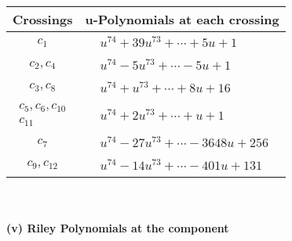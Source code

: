 \documentclass[1p]{elsarticle_modified}
\theoremstyle{definition}
\begin{document}
\begin{tabular}{m{50pt}|m{274pt}}
Crossings & \hspace{64pt}u-Polynomials at each crossing \\
\hline $$\begin{aligned}c_{1}\end{aligned}$$&$\begin{aligned}
&u^{74}+39 u^{73}+\cdots+5 u+1
\end{aligned}$\\
\hline $$\begin{aligned}c_{2},c_{4}\end{aligned}$$&$\begin{aligned}
&u^{74}-5 u^{73}+\cdots-5 u+1
\end{aligned}$\\
\hline $$\begin{aligned}c_{3},c_{8}\end{aligned}$$&$\begin{aligned}
&u^{74}+u^{73}+\cdots+8 u+16
\end{aligned}$\\
\hline $$\begin{aligned}c_{5},c_{6},c_{10}\\c_{11}\end{aligned}$$&$\begin{aligned}
&u^{74}+2 u^{73}+\cdots+u+1
\end{aligned}$\\
\hline $$\begin{aligned}c_{7}\end{aligned}$$&$\begin{aligned}
&u^{74}-27 u^{73}+\cdots-3648 u+256
\end{aligned}$\\
\hline $$\begin{aligned}c_{9},c_{12}\end{aligned}$$&$\begin{aligned}
&u^{74}-14 u^{73}+\cdots-401 u+131
\end{aligned}$\\
\hline
\end{tabular}\\~\\
\newpage\renewcommand{\arraystretch}{1}
\flushleft \textbf{(v) Riley Polynomials at the component}\newline \\
\end{document}
